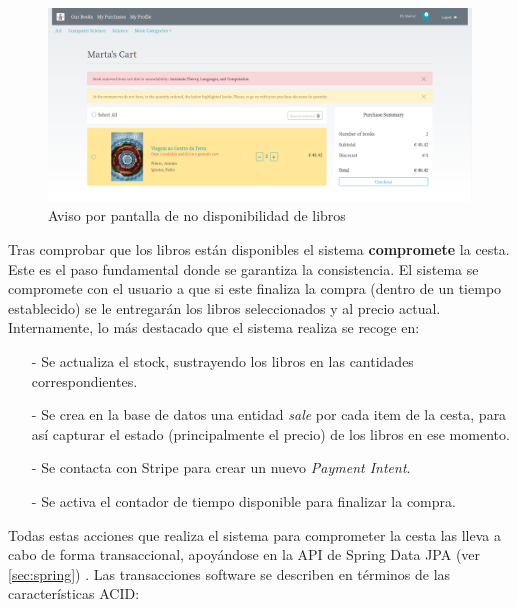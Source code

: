 \documentclass[a4paper,12pt,twoside,openright]{report}
\begin{document}
    \begin{figure}[hbt!]
    	\centering
    	\includegraphics[width=\textwidth]{cart_alert}
    	\caption{Aviso por pantalla de no disponibilidad de libros}
    	\label{fig:cart_alert}
    \end{figure}
    
    Tras comprobar que los libros están disponibles el sistema \textbf{compromete} la cesta. Este es el paso fundamental donde se garantiza la consistencia. El sistema se compromete con el usuario a que si este finaliza la compra (dentro de un tiempo establecido) se le entregarán los libros seleccionados y al precio actual. Internamente, lo más destacado que el sistema realiza se recoge en:
    
    \begin{itemize}
    	\item[-] Se actualiza el stock, sustrayendo los libros en las cantidades correspondientes.
    	\item[-] Se crea en la base de datos una entidad \emph{sale} por cada item de la cesta, para así capturar el estado (principalmente el precio) de los libros en ese momento.
    	\item[-] Se contacta con Stripe para crear un nuevo \emph{Payment Intent}.
    	\item[-] Se activa el contador de tiempo disponible para finalizar la compra.
    \end{itemize}
    
    Todas estas acciones que realiza el sistema para comprometer la cesta las lleva a cabo de forma transaccional, apoyándose en la API de Spring Data JPA (ver \ref{sec:spring}) \cite{JanssenTransactions}. Las transacciones software se describen en términos de las características ACID:
    
\end{document}
